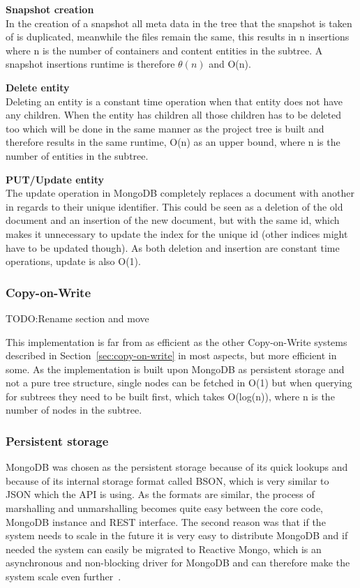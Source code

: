\documentclass[a4paper,12pt]{article}
\newcounter{subsubsubsection}[subsubsection]
\newcommand{\fix}{\colorbox{yellow!30}{TODO:}}
\begin{document}
\par \textbf{Snapshot creation} \\
In the creation of a snapshot all meta data in the tree that the snapshot is taken of is duplicated,
meanwhile the files remain the same, this results in n insertions where n is the number of
containers and content entities in the subtree. A snapshot insertions runtime is therefore
$\theta(n)$ and O(n). \\

\par \textbf{Delete entity} \\
Deleting an entity is a constant time operation when that entity does not have any children. When
the entity has children all those children has to be deleted too which will be done in the same
manner as the project tree is built and therefore results in the same runtime, O(n) as an upper
bound, where n is the number of entities in the subtree.\\

\par \textbf{PUT/Update entity} \\
The update operation in MongoDB completely replaces a document with another in regards to their
unique identifier. This could be seen as a deletion of the old document and an insertion of the new
document, but with the same id, which makes it unnecessary to update the index for the unique id
(other indices might have to be updated though). As both deletion and insertion are constant time
operations, update is also O(1).\\

\subsubsection{Copy-on-Write}
\fix Rename section and move

This implementation is far from as efficient as the other Copy-on-Write systems described in
Section~\ref{sec:copy-on-write} in most aspects, but more efficient in some. As the implementation
is built upon MongoDB as persistent storage and not a pure tree structure, single nodes can be
fetched in O(1) but when querying for subtrees they need to be built first, which takes O(log(n)),
where n is the number of nodes in the subtree. 

\subsubsection{Persistent storage} \label{sec:persistent_storage}
MongoDB was chosen as the persistent storage because of its quick lookups and because of its
internal storage format called BSON, which is very similar to JSON which the API is using. As the
formats are similar, the process of marshalling and unmarshalling becomes quite easy between the
core code, MongoDB instance and REST interface.  The second reason was that if the system needs to
scale in the future it is very easy to distribute MongoDB and if needed the system can easily be
migrated to Reactive Mongo, which is an asynchronous and non-blocking driver for MongoDB and can
therefore make the system scale even further~\cite{REACTIVEMONGO}.
\end{document}
